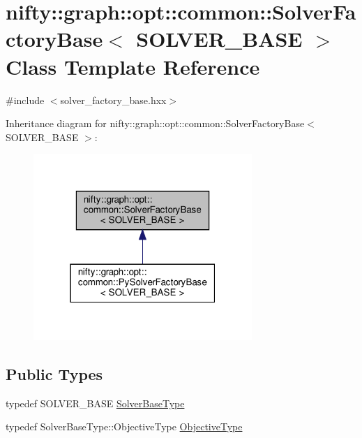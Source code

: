 \hypertarget{classnifty_1_1graph_1_1opt_1_1common_1_1SolverFactoryBase}{}\section{nifty\+:\+:graph\+:\+:opt\+:\+:common\+:\+:Solver\+Factory\+Base$<$ S\+O\+L\+V\+E\+R\+\_\+\+B\+A\+SE $>$ Class Template Reference}
\label{classnifty_1_1graph_1_1opt_1_1common_1_1SolverFactoryBase}


{\ttfamily \#include $<$solver\+\_\+factory\+\_\+base.\+hxx$>$}



Inheritance diagram for nifty\+:\+:graph\+:\+:opt\+:\+:common\+:\+:Solver\+Factory\+Base$<$ S\+O\+L\+V\+E\+R\+\_\+\+B\+A\+SE $>$\+:
\nopagebreak
\begin{figure}[H]
\begin{center}
\leavevmode
\includegraphics[width=235pt]{classnifty_1_1graph_1_1opt_1_1common_1_1SolverFactoryBase__inherit__graph}
\end{center}
\end{figure}
\subsection*{Public Types}
\begin{DoxyCompactItemize}
\item 
typedef S\+O\+L\+V\+E\+R\+\_\+\+B\+A\+SE \hyperlink{classnifty_1_1graph_1_1opt_1_1common_1_1SolverFactoryBase_a83f347591f4cffa7afb13c8f495dcce2}{Solver\+Base\+Type}
\item 
typedef Solver\+Base\+Type\+::\+Objective\+Type \hyperlink{classnifty_1_1graph_1_1opt_1_1common_1_1SolverFactoryBase_ab71d93640cf3fbc0bc980450d5db6e45}{Objective\+Type}
\end{DoxyCompactItemize}
